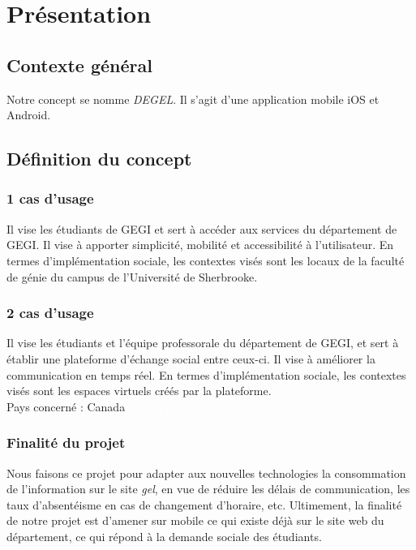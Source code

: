\section{Présentation}
	\subsection{Contexte général}
	Notre concept se nomme \emph{DEGEL}. Il s'agit d'une application mobile iOS et Android.

	\subsection{Définition du concept}
	
		\subsubsection{1\ier{} cas d'usage} Il vise les étudiants de GEGI et sert à accéder aux services du département de GEGI. Il vise à apporter simplicité, mobilité et accessibilité à l'utilisateur. En termes d'implémentation sociale, les contextes visés sont les locaux de la faculté de génie du campus de l'Université de Sherbrooke.
		
		\subsubsection{2\ieme{} cas d'usage} Il vise les étudiants et l'équipe professorale du département de GEGI, et sert à établir une plateforme d'échange social entre ceux-ci. Il vise à améliorer la communication en temps réel. En termes d'implémentation sociale, les contextes visés sont les espaces virtuels créés par la plateforme. \\
	
			Pays concerné : Canada \textcolor{white}{et le Québec libre !}
	
		\subsubsection{Finalité du projet}
		Nous faisons ce projet pour adapter aux nouvelles technologies la consommation de l'information sur le site \emph{gel}, en vue de réduire les délais de communication, les taux d'absentéisme en cas de changement d'horaire, etc. Ultimement, la finalité de notre projet est d'amener sur mobile ce qui existe déjà sur le site web du département, ce qui répond à la demande sociale des étudiants. \\
		
